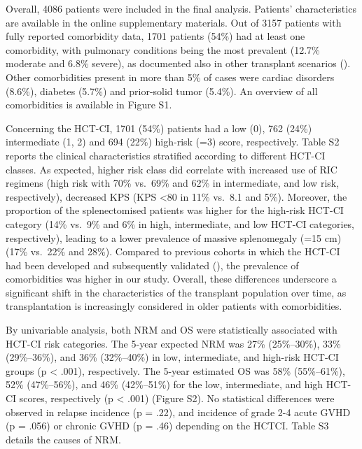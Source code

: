 \documentclass[
  letterpaper,
  paper=240mm:170mm,
  twoside=true,
  open=right,
  fontsize=10pt,
  pagesize=false,
  BCOR=15mm,
  DIV=14,
  headinclude=true,
  footinclude=false,
  headsepline=on]{scrbook}
\begin{document}
Overall, 4086 patients were included in the final analysis. Patients'
characteristics are available in the online supplementary materials. Out
of 3157 patients with fully reported comorbidity data, 1701 patients
(54\%) had at least one comorbidity, with pulmonary conditions being the
most prevalent (12.7\% moderate and 6.8\% severe), as documented also in
other transplant scenarios
(). Other comorbidities present in more than 5\% of
cases were cardiac disorders (8.6\%), diabetes (5.7\%) and prior-solid
tumor (5.4\%). An overview of all comorbidities is available in Figure
S1.

Concerning the HCT-CI, 1701 (54\%) patients had a low (0), 762 (24\%)
intermediate (1, 2) and 694 (22\%) high-risk (=3) score, respectively.
Table S2 reports the clinical characteristics stratified according to
different HCT-CI classes. As expected, higher risk class did correlate
with increased use of RIC regimens (high risk with 70\% vs.~69\% and
62\% in intermediate, and low risk, respectively), decreased KPS (KPS
\textless80 in 11\% vs.~8.1 and 5\%). Moreover, the proportion of the
splenectomised patients was higher for the high-risk HCT-CI category
(14\% vs.~9\% and 6\% in high, intermediate, and low HCT-CI categories,
respectively), leading to a lower prevalence of massive splenomegaly
(=15 cm) (17\% vs.~22\% and 28\%). Compared to previous cohorts in which
the HCT-CI had been developed and subsequently validated
(), the prevalence of comorbidities was higher in our
study. Overall, these differences underscore a significant shift in the
characteristics of the transplant population over time, as
transplantation is increasingly considered in older patients with
comorbidities.

By univariable analysis, both NRM and OS were statistically associated
with HCT-CI risk categories. The 5-year expected NRM was 27\%
(25\%--30\%), 33\% (29\%--36\%), and 36\% (32\%--40\%) in low,
intermediate, and high-risk HCT-CI groups (p \textless{} .001),
respectively. The 5-year estimated OS was 58\% (55\%--61\%), 52\%
(47\%--56\%), and 46\% (42\%--51\%) for the low, intermediate, and high
HCT-CI scores, respectively (p \textless{} .001) (Figure S2). No
statistical differences were observed in relapse incidence (p = .22),
and incidence of grade 2-4 acute GVHD (p = .056) or chronic GVHD (p =
.46) depending on the HCTCI. Table S3 details the causes of NRM.
\end{document}

